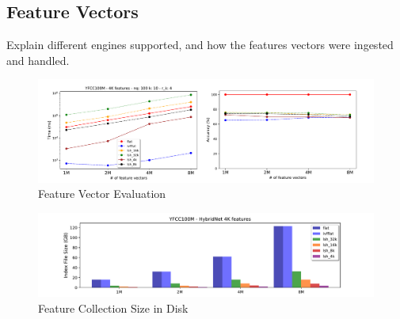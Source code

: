 \subsection{Feature Vectors}

Explain different engines supported, and how the features vectors
were ingested and handled.

\begin{figure}[]
\centering
\includegraphics[width=\textwidth]{figures/features_alternatives}
\caption{Feature Vector Evaluation}
\label{fig:features_eval}
\end{figure}

\begin{figure}[]
\centering
\includegraphics[width=\textwidth]{figures/features_disksize}
\caption{Feature Collection Size in Disk}
\label{fig:features_size_does_matter}
\end{figure}
